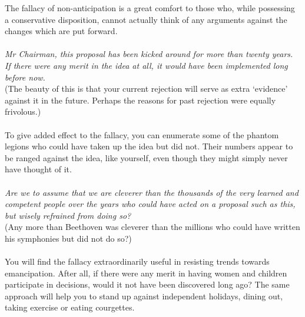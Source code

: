 \documentclass[a4paper,12pt,single,pdftex]{scrartcl}
\begin{document}
    
      The fallacy of non-anticipation is a great comfort to those who, while possessing a conservative disposition, cannot actually think of any arguments against the changes which are put forward.
    \\

    
       
    \\

    
      {\em Mr Chairman, this proposal has been kicked around for more than twenty years. If there were any merit in the idea at all, it would have been implemented long before now.}
    \\

    
      (The beauty of this is that your current rejection will serve as extra ‘evidence’ against it in the future. Perhaps the reasons for past rejection were equally frivolous.)
    \\

    
       
    \\

    
      To give added effect to the fallacy, you can enumerate some of the phantom legions who could have taken up the idea but did not. Their numbers appear to be ranged against the idea, like yourself, even though they might simply never have thought of it.
    \\

    
       
    \\

    
      {\em Are we to assume that we are cleverer than the thousands of the very learned and competent people over the years who could have acted on a proposal such as this, but wisely refrained from doing so?}
    \\

    
      (Any more than Beethoven was cleverer than the millions who could have written his symphonies but did not do so?)
    \\

    
       
    \\

    
      You will find the fallacy extraordinarily useful in resisting trends towards emancipation. After all, if there were any merit in having women and children participate in decisions, would it not have been discovered long ago? The same approach will help you to stand up against independent holidays, dining out, taking exercise or eating courgettes.
    \\
\end{document}
